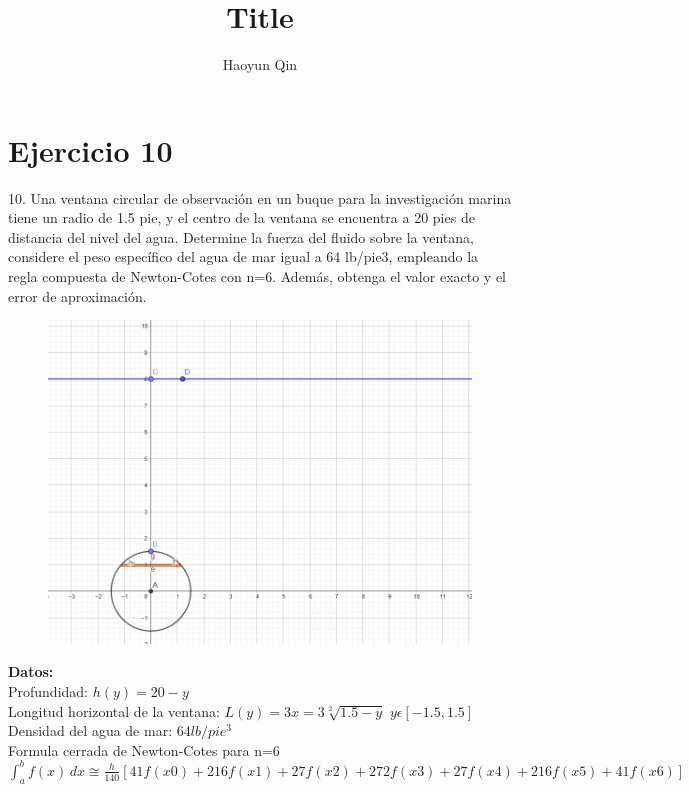\documentclass{article}
\title{Title}
\author{Haoyun Qin}
\theoremstyle{mytheoremstyle}
\theoremstyle{mytheoremstyle}
\theoremstyle{myproblemstyle}
\begin{document}
\section*{Ejercicio 10}
10. Una ventana circular de observación en un buque para la investigación marina tiene un radio de 1.5 pie, 
y el centro de la ventana se encuentra a 20 pies de distancia del nivel del agua. Determine la fuerza del 
fluido sobre la ventana, considere el peso específico del agua de mar igual a 64 lb/pie3, empleando la 
regla compuesta de Newton-Cotes con n=6. Además, obtenga el valor exacto y el error de aproximación. \\

\begin{figure}[ht]
    \includegraphics*[scale=0.55]{img/nc10_1.png}
\end{figure}
\textbf{Datos:}
\\Profundidad: $h(y)=20-y$
\\Longitud horizontal de la ventana: $L(y)=3x=3\sqrt[2]{1.5-y}$ \indent      $y\epsilon [-1.5,1.5]$
\\Densidad del agua de mar: $64lb/pie^3$
\\Formula cerrada de Newton-Cotes para n=6 $\int_{a}^{b} f(x) \,dx \cong \frac{h}{140}[41f(x0)+216f(x1)+27f(x2)+272f(x3)+27f(x4)+216f(x5)+41f(x6)]$
\end{document}
